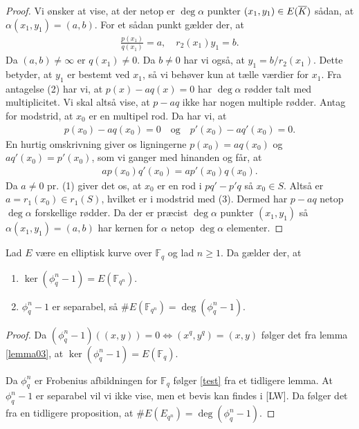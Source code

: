 \begin{proof}
Vi ønsker at vise, at der netop er $\deg \alpha$ punkter $(x_1, y_1) \in E(\overline{K})$ sådan,
at $\alpha(x_1, y_1) = (a, b)$. For et sådan punkt gælder der, at 
\begin{align*}
	\frac{p(x_1)}{q(x_1)} = a, \quad r_2(x_1) y_1 = b.
\end{align*}
Da $(a, b) \neq \infty$ er $q(x_1) \neq 0$. %
Da $b \neq 0$ har vi også, at $y_1 = b / r_2(x_1)$. Dette betyder, at $y_1$ er bestemt
ved $x_1$, så vi behøver kun at tælle værdier for $x_1$. Fra antagelse (2) har vi, at 
$p(x) - aq(x) = 0$ har $\deg \alpha$ rødder talt med multiplicitet. Vi skal altså vise,
at $p-aq$ ikke har nogen multiple rødder. Antag for modstrid, at $x_0$ er en multipel
rod. Da har vi, at
\begin{align*}
	p(x_0) - aq(x_0) = 0 \quad \text{og} \quad p'(x_0) - aq'(x_0) = 0.
\end{align*}
En hurtig omskrivning giver os ligningerne $p(x_0)=aq(x_0)$ og $aq'(x_0)=p'(x_0)$, 
som vi ganger med hinanden og får, at 
\begin{align*}
	a p(x_0)q'(x_0) = ap'(x_0)q(x_0).
\end{align*} 
Da $a \neq 0$ pr. (1) giver det os, at $x_0$ er en rod i $pq'-p'q$ så $x_0 \in S$.
Altså er $a=r_1(x_0) \in r_1(S)$, hvilket er i modstrid med (3). Dermed har 
$p-aq$ netop $\deg \alpha$ forskellige rødder. Da der er præcist $\deg \alpha$ 
punkter $(x_1, y_1)$ så $\alpha(x_1, y_1) = (a, b)$ har kernen for $\alpha$ netop
$\deg \alpha$ elementer.
\end{proof}

\begin{proposition}
Lad $E$ være en elliptisk kurve over $\mathbb{F}_q$ og lad $n \geq 1$. Da gælder der,
at 
\begin{enumerate}
	\item $\ker (\phi_{q}^n - 1) = E(\mathbb{F}_{q^n})$. \label{test}
	\item $\phi_{q}^{n}-1$ er separabel, så $\#E(\mathbb{F}_{q^n})=\deg (\phi_{q}^{n}-1)$. 
\end{enumerate}
\end{proposition}
\begin{proof}
Da $(\phi_{q}^{n} - 1)((x,y)) = 0 \Leftrightarrow (x^q, y^q) = (x, y)$ følger det fra
lemma \ref{lemma03}, at $\ker(\phi_{q}^{n}-1)=E(\mathbb{F}_q)$.

Da $\phi_{q}^{n}$ er Frobenius afbildningen for $\mathbb{F}_q$ følger \eqref{test} fra et 
tidligere lemma. At $\phi_{q}^{n} -1$ er separabel vil vi ikke vise, men et bevis kan findes
i [LW]. Da følger det fra en tidligere proposition, at $\#E(E_{q^n})=\deg(\phi_{q}^{n} -1)$.
\end{proof}

